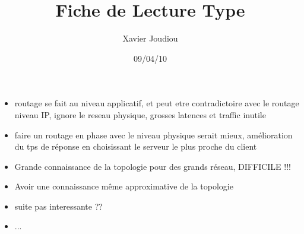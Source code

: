 \documentclass[11pt,a4paper]{article}
\title{Fiche de Lecture Type}
\author{Xavier Joudiou}
\date{09/04/10}
\begin{document}
	
  \begin{itemize}
  \renewcommand{\labelitemi}{$\Rightarrow$}
	\item routage se fait au niveau applicatif, et peut etre contradictoire avec le routage niveau IP, ignore le reseau physique, grosses latences et traffic inutile
	\item faire un routage en phase avec le niveau physique serait mieux, amélioration du tps de réponse en choisissant le serveur le plus proche du client
	\item Grande connaissance de la topologie pour des grands réseau, DIFFICILE !!!
	\item Avoir une connaissance même approximative de la topologie
	\item suite pas interessante ??
	\item ...
  \end{itemize}
\end{document}
